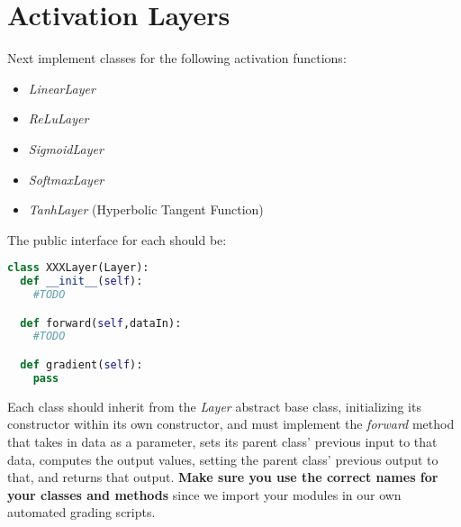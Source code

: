 \documentclass[12pt]{article}
\begin{document}
\newpage
\section{Activation Layers}
Next implement classes for the following activation functions:
\begin{itemize}
\item \emph{LinearLayer}
\item \emph{ReLuLayer}
\item \emph{SigmoidLayer}
\item \emph{SoftmaxLayer}
\item \emph{TanhLayer} (Hyperbolic Tangent Function)
\end{itemize}

\noindent
The public interface for each should be:
\begin{lstlisting}[language=Python]
class XXXLayer(Layer):
  def __init__(self):
    #TODO

  def forward(self,dataIn):
    #TODO

  def gradient(self):
    pass
\end{lstlisting}

\noindent
Each class should inherit from the \emph{Layer} abstract base class, initializing its constructor within its own constructor, and must implement the \emph{forward} method that takes in data as a parameter, sets its parent class' previous input to that data, computes the output values, setting the parent class' previous output to that, and returns that output.  \textbf{Make sure you use the correct names for your classes and methods} since we import your modules in our own automated grading scripts.

\newpage
\end{document}
